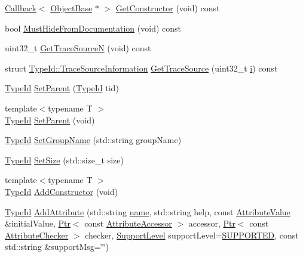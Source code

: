 \begin{DoxyCompactItemize}
\hyperlink{classns3_1_1Callback}{Callback}$<$ \hyperlink{classns3_1_1ObjectBase}{Object\+Base} $\ast$ $>$ \hyperlink{classns3_1_1TypeId_ad9b0bc71ee7593a1ff23ff8d53938e95}{Get\+Constructor} (void) const 
\item 
bool \hyperlink{classns3_1_1TypeId_ad7f960b525bc45a1e1285ff2312963c7}{Must\+Hide\+From\+Documentation} (void) const 
\item 
uint32\+\_\+t \hyperlink{classns3_1_1TypeId_a432454e79c9eee2f236fe00ac54205a3}{Get\+Trace\+SourceN} (void) const 
\item 
struct \hyperlink{structns3_1_1TypeId_1_1TraceSourceInformation}{Type\+Id\+::\+Trace\+Source\+Information} \hyperlink{classns3_1_1TypeId_ace6eba2cb63ba49c2810d22c21818884}{Get\+Trace\+Source} (uint32\+\_\+t \hyperlink{lte__uplink__power__control_8m_a6f6ccfcf58b31cb6412107d9d5281426}{i}) const 
\item 
\hyperlink{classns3_1_1TypeId}{Type\+Id} \hyperlink{classns3_1_1TypeId_abaaca67ab7d2471067e7c275df0f7309}{Set\+Parent} (\hyperlink{classns3_1_1TypeId}{Type\+Id} tid)
\item 
{\footnotesize template$<$typename T $>$ }\\\hyperlink{classns3_1_1TypeId}{Type\+Id} \hyperlink{classns3_1_1TypeId_a0e73f45f1beca51afb7faea4d1689279}{Set\+Parent} (void)
\item 
\hyperlink{classns3_1_1TypeId}{Type\+Id} \hyperlink{classns3_1_1TypeId_a87ab97caba5bbbd080b4490576f8bb40}{Set\+Group\+Name} (std\+::string group\+Name)
\item 
\hyperlink{classns3_1_1TypeId}{Type\+Id} \hyperlink{classns3_1_1TypeId_a1a3e9f4b3c822ec5450d7b44202f0dda}{Set\+Size} (std\+::size\+\_\+t size)
\item 
{\footnotesize template$<$typename T $>$ }\\\hyperlink{classns3_1_1TypeId}{Type\+Id} \hyperlink{classns3_1_1TypeId_a06aaf693dc4dbe69b805d942c893ee64}{Add\+Constructor} (void)
\item 
\hyperlink{classns3_1_1TypeId}{Type\+Id} \hyperlink{classns3_1_1TypeId_ad991df734fa67dacec701fe35b58c83b}{Add\+Attribute} (std\+::string \hyperlink{generate__test__data__lte__spectrum__model_8m_ab74e6bf80237ddc4109968cedc58c151}{name}, std\+::string help, const \hyperlink{classns3_1_1AttributeValue}{Attribute\+Value} \&initial\+Value, \hyperlink{classns3_1_1Ptr}{Ptr}$<$ const \hyperlink{classns3_1_1AttributeAccessor}{Attribute\+Accessor} $>$ accessor, \hyperlink{classns3_1_1Ptr}{Ptr}$<$ const \hyperlink{classns3_1_1AttributeChecker}{Attribute\+Checker} $>$ checker, \hyperlink{classns3_1_1TypeId_ad55d31e57490a83a3ededa096a8d2588}{Support\+Level} support\+Level=\hyperlink{classns3_1_1TypeId_ad55d31e57490a83a3ededa096a8d2588a3eb3cddc13c7c70f1ab58e15babdda11}{S\+U\+P\+P\+O\+R\+T\+ED}, const std\+::string \&support\+Msg=\char`\"{}\char`\"{})

\end{DoxyCompactItemize}
